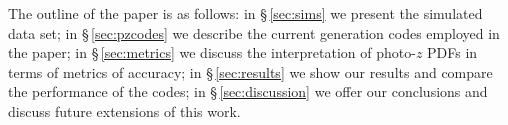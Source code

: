 The outline of the paper is as follows: in \S\,\ref{sec:sims} we present the simulated data set; in \S\,\ref{sec:pzcodes} we describe the current generation codes employed in the paper;  in \S\,\ref{sec:metrics} we discuss the interpretation of photo-$z$ PDFs in terms of metrics of accuracy; in \S\,\ref{sec:results} we show our results and compare the performance of the codes; in \S\,\ref{sec:discussion} we offer our conclusions and discuss future extensions of this work.
